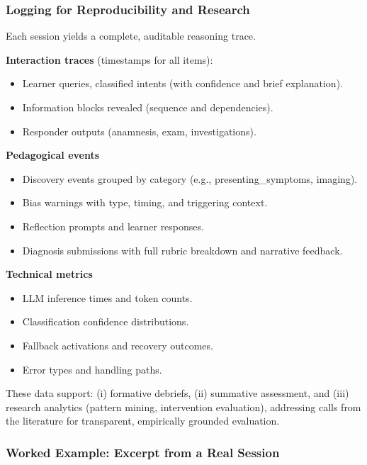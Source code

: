 \subsubsection{Logging for Reproducibility and Research}

Each session yields a complete, auditable reasoning trace.

\noindent\textbf{Interaction traces}
(timestamps for all items):
\begin{itemize}
  \item Learner queries, classified intents (with confidence and brief explanation).
  \item Information blocks revealed (sequence and dependencies).
  \item Responder outputs (anamnesis, exam, investigations).
\end{itemize}

\noindent\textbf{Pedagogical events}
\begin{itemize}
  \item Discovery events grouped by category (e.g., presenting\_symptoms, imaging).
  \item Bias warnings with type, timing, and triggering context.
  \item Reflection prompts and learner responses.
  \item Diagnosis submissions with full rubric breakdown and narrative feedback.
\end{itemize}

\noindent\textbf{Technical metrics}
\begin{itemize}
  \item LLM inference times and token counts.
  \item Classification confidence distributions.
  \item Fallback activations and recovery outcomes.
  \item Error types and handling paths.
\end{itemize}

These data support: (i) formative debriefs, (ii) summative assessment, and
(iii) research analytics (pattern mining, intervention evaluation), addressing
calls from the literature for transparent, empirically grounded evaluation.

\subsubsection{Worked Example: Excerpt from a Real Session}

